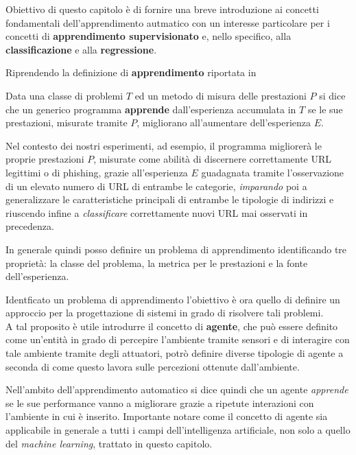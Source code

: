 \documentclass[../../main.tex]{subfiles}
\begin{document}
    Obiettivo di questo capitolo è di fornire una breve introduzione ai concetti fondamentali dell'apprendimento autmatico con un interesse particolare per i concetti di \textbf{apprendimento supervisionato} e, nello specifico, alla \textbf{classificazione} e alla \textbf{regressione}.

    Riprendendo la definizione di \textbf{apprendimento} riportata in \cite{Mitchell97}
    
    \begin{dfn}
        Data una classe di problemi $T$ ed un metodo di misura delle prestazioni $P$ si dice che un generico programma \textbf{apprende} dall'esperienza accumulata in $T$ se le sue prestazioni, misurate tramite $P$, migliorano all'aumentare dell'esperienza $E$.
    \end{dfn}

    Nel contesto dei nostri esperimenti, ad esempio, il programma migliorerà le proprie prestazioni $P$, misurate come abilità di discernere correttamente URL legittimi o di phishing, grazie all'esperienza  $E$ guadagnata tramite l'osservazione di un elevato numero di URL di entrambe le categorie, \textit{imparando} poi a generalizzare le caratteristiche principali di entrambe le tipologie di indirizzi e riuscendo infine a \textit{classificare} correttamente nuovi URL mai osservati in precedenza.


    In generale quindi posso definire un problema di apprendimento identificando tre proprietà: la classe del problema, la metrica per le prestazioni e la fonte dell'esperienza.

    Identficato un problema di apprendimento l'obiettivo è ora quello di definire un approccio per la progettazione di sistemi in grado di risolvere tali problemi.\\
    A tal proposito è utile introdurre il concetto di \textbf{agente}, che può essere definito come un'entità in grado di percepire l'ambiente tramite sensori e di interagire con tale ambiente tramite degli attuatori, potrò definire diverse tipologie di agente a seconda di come questo lavora sulle percezioni ottenute dall'ambiente.

    Nell'ambito dell'apprendimento automatico si dice quindi che un agente \textit{apprende} se le sue performance vanno a migliorare grazie a ripetute interazioni con l'ambiente in cui è inserito.
    Importante notare come il concetto di agente sia applicabile in generale a tutti i campi dell'intelligenza artificiale, non solo a quello del \textit{machine learning}, trattato in questo capitolo.
\end{document}
